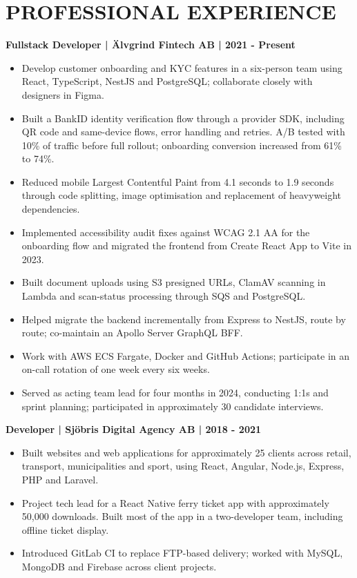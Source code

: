 \documentclass[11pt,a4paper]{article}
\newcommand{\cvsection}[1]{\section*{#1}}
\newcommand{\cvrole}[1]{\par\noindent\textbf{#1}\par}
\begin{document}
\cvsection{PROFESSIONAL EXPERIENCE}
\cvrole{Fullstack Developer | Älvgrind Fintech AB | 2021 - Present}
\begin{itemize}
\item Develop customer onboarding and KYC features in a six-person team using React, TypeScript, NestJS and PostgreSQL; collaborate closely with designers in Figma.
\item Built a BankID identity verification flow through a provider SDK, including QR code and same-device flows, error handling and retries. A/B tested with 10\% of traffic before full rollout; onboarding conversion increased from 61\% to 74\%.
\item Reduced mobile Largest Contentful Paint from 4.1 seconds to 1.9 seconds through code splitting, image optimisation and replacement of heavyweight dependencies.
\item Implemented accessibility audit fixes against WCAG 2.1 AA for the onboarding flow and migrated the frontend from Create React App to Vite in 2023.
\item Built document uploads using S3 presigned URLs, ClamAV scanning in Lambda and scan-status processing through SQS and PostgreSQL.
\item Helped migrate the backend incrementally from Express to NestJS, route by route; co-maintain an Apollo Server GraphQL BFF.
\item Work with AWS ECS Fargate, Docker and GitHub Actions; participate in an on-call rotation of one week every six weeks.
\item Served as acting team lead for four months in 2024, conducting 1:1s and sprint planning; participated in approximately 30 candidate interviews.
\end{itemize}

\newpage
\cvrole{Developer | Sjöbris Digital Agency AB | 2018 - 2021}
\begin{itemize}
\item Built websites and web applications for approximately 25 clients across retail, transport, municipalities and sport, using React, Angular, Node.js, Express, PHP and Laravel.
\item Project tech lead for a React Native ferry ticket app with approximately 50,000 downloads. Built most of the app in a two-developer team, including offline ticket display.
\item Introduced GitLab CI to replace FTP-based delivery; worked with MySQL, MongoDB and Firebase across client projects.
\end{itemize}
\end{document}
